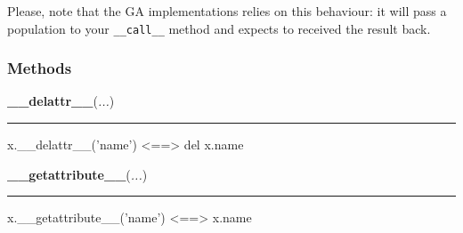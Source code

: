 Please, note that the GA implementations relies on this behaviour: it will
pass a population to your \texttt{{\_}{\_}call{\_}{\_}} method and expects to received the
result back.


  \subsubsection{Methods}

    \label{object:__delattr__}

    \vspace{0.5ex}

    \begin{boxedminipage}{\textwidth}

    \raggedright \textbf{\_\_delattr\_\_}(\textit{...})

    \vspace{-1.5ex}

    \rule{\textwidth}{0.5\fboxrule}

x.{\_}{\_}delattr{\_}{\_}('name') {\textless}=={\textgreater} del x.name
    \vspace{1ex}

    \end{boxedminipage}

    \label{object:__getattribute__}

    \vspace{0.5ex}

    \begin{boxedminipage}{\textwidth}

    \raggedright \textbf{\_\_getattribute\_\_}(\textit{...})

    \vspace{-1.5ex}

    \rule{\textwidth}{0.5\fboxrule}

x.{\_}{\_}getattribute{\_}{\_}('name') {\textless}=={\textgreater} x.name
    \vspace{1ex}

    \end{boxedminipage}

    \label{object:__hash__}

